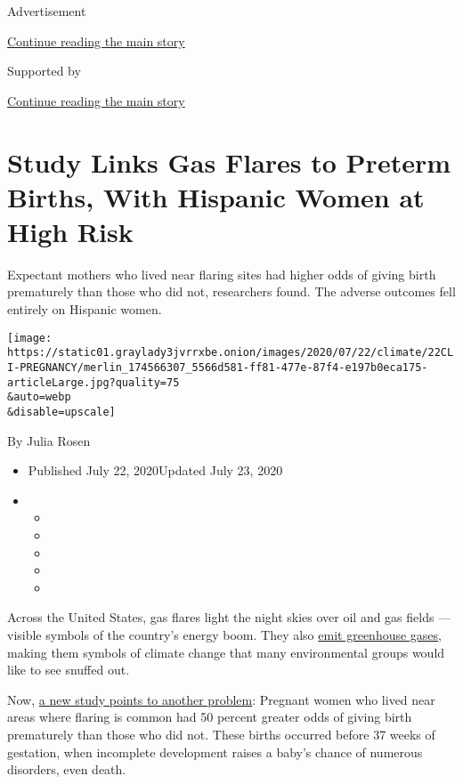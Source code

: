 Advertisement

\protect\hyperlink{after-top}{Continue reading the main story}

Supported by

\protect\hyperlink{after-sponsor}{Continue reading the main story}

\hypertarget{study-links-gas-flares-to-preterm-births-with-hispanic-women-at-high-risk}{%
\section{Study Links Gas Flares to Preterm Births, With Hispanic Women
at High
Risk}\label{study-links-gas-flares-to-preterm-births-with-hispanic-women-at-high-risk}}

Expectant mothers who lived near flaring sites had higher odds of giving
birth prematurely than those who did not, researchers found. The adverse
outcomes fell entirely on Hispanic women.

\texttt{[image: https://static01.graylady3jvrrxbe.onion/images/2020/07/22/climate/22CLI-PREGNANCY/merlin\_174566307\_5566d581-ff81-477e-87f4-e197b0eca175-articleLarge.jpg?quality=75\\\&auto=webp\\\&disable=upscale]}

By Julia Rosen

\begin{itemize}
\item
  Published July 22, 2020Updated July 23, 2020
\item
  \begin{itemize}
  \item
  \item
  \item
  \item
  \item
  \end{itemize}
\end{itemize}

Across the United States, gas flares light the night skies over oil and
gas fields --- visible symbols of the country's energy boom. They also
\href{https://www.worldbank.org/en/programs/gasflaringreduction\#1}{emit
greenhouse gases}, making them symbols of climate change that many
environmental groups would like to see snuffed out.

Now, \href{https://ehp.niehs.nih.gov/doi/10.1289/EHP6394}{a new study
points to another problem}: Pregnant women who lived near areas where
flaring is common had 50 percent greater odds of giving birth
prematurely than those who did not. These births occurred before 37
weeks of gestation, when incomplete development raises a baby's chance
of numerous disorders, even death.

